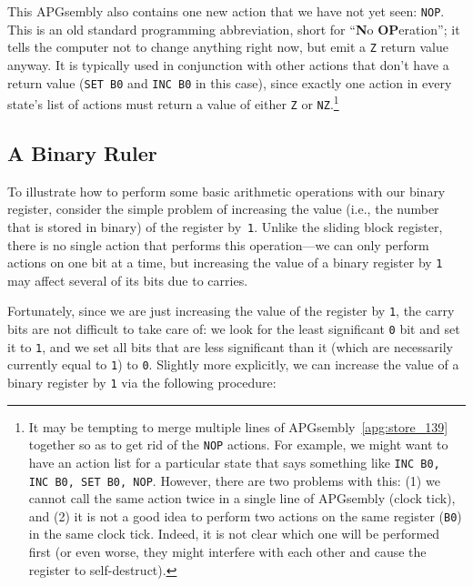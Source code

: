 This APGsembly also contains one new action that we have not yet seen: \texttt{NOP}. This is an old standard programming abbreviation, short for ``\textbf{N}o \textbf{OP}eration''; it tells the computer not to change anything right now, but emit a \texttt{Z} return value anyway. It is typically used in conjunction with other actions that don't have a return value (\texttt{SET B0} and \texttt{INC B0} in this case), since exactly one action in every state's list of actions must return a value of either \texttt{Z} or \texttt{NZ}.\footnote{It may be tempting to merge multiple lines of APGsembly~\ref{apg:store_139} together so as to get rid of the \texttt{NOP} actions. For example, we might want to have an action list for a particular state that says something like \texttt{INC B0, INC B0, SET B0, NOP}. However, there are two problems with this: (1) we cannot call the same action twice in a single line of APGsembly (clock tick), and (2) it is not a good idea to perform two actions on the same register (\texttt{B0}) in the same clock tick. Indeed, it is not clear which one will be performed first (or even worse, they might interfere with each other and cause the register to self-destruct).}


\subsection{A Binary Ruler}\label{sec:binary_ruler}

To illustrate how to perform some basic arithmetic operations with our binary register, consider the simple problem of increasing the value (i.e., the number that is stored in binary) of the register by~\texttt{1}. Unlike the sliding block register, there is no single action that performs this operation---we can only perform actions on one bit at a time, but increasing the value of a binary register by \texttt{1} may affect several of its bits due to carries.

Fortunately, since we are just increasing the value of the register by \texttt{1}, the carry bits are not difficult to take care of: we look for the least significant \texttt{0} bit and set it to \texttt{1}, and we set all bits that are less significant than it (which are necessarily currently equal to \texttt{1}) to \texttt{0}. Slightly more explicitly, we can increase the value of a binary register by \texttt{1} via the following procedure:\smallskip

